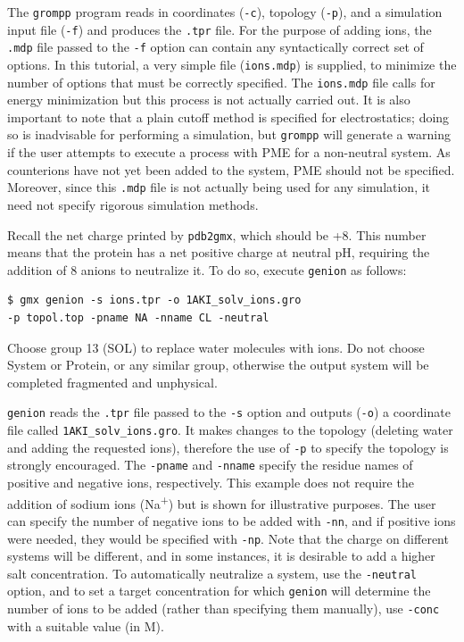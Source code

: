 \documentclass[9pt,tutorial]{livecoms}
\begin{document}
The \texttt{grompp} program reads in coordinates (\texttt{-c}), topology (\texttt{-p}), and a simulation input file (\texttt{-f}) and produces the \texttt{.tpr} file. For the purpose of adding ions, the \texttt{.mdp} file passed to the \texttt{-f} option can contain any syntactically correct set of options. In this tutorial, a very simple file (\texttt{ions.mdp}) is supplied, to minimize the number of options that must be correctly specified. The \texttt{ions.mdp} file calls for energy minimization but this process is not actually carried out. It is also important to note that a plain cutoff method is specified for electrostatics; doing so is inadvisable for performing a simulation, but \texttt{grompp} will generate a warning if the user attempts to execute a process with PME for a non-neutral system. As counterions have not yet been added to the system, PME should not be specified. Moreover, since this \texttt{.mdp} file is not actually being used for any simulation, it need not specify rigorous simulation methods.

Recall the net charge printed by \texttt{pdb2gmx}, which should be +8. This number means that the protein has a net positive charge at neutral pH, requiring the addition of 8 anions to neutralize it. To do so, execute \texttt{genion} as follows:

\begin{verbatim}
$ gmx genion -s ions.tpr -o 1AKI_solv_ions.gro 
-p topol.top -pname NA -nname CL -neutral
\end{verbatim}

Choose group 13 (SOL) to replace water molecules with ions. Do not choose System or Protein, or any similar group, otherwise the output system will be completed fragmented and unphysical.

\texttt{genion} reads the \texttt{.tpr} file passed to the \texttt{-s} option and outputs (\texttt{-o}) a coordinate file called \texttt{1AKI\_solv\_ions.gro}. It makes changes to the topology (deleting water and adding the requested ions), therefore the use of \texttt{-p} to specify the topology is strongly encouraged. The \texttt{-pname} and \texttt{-nname} specify the residue names of positive and negative ions, respectively. This example does not require the addition of sodium ions (Na\textsuperscript{+}) but is shown for illustrative purposes. The user can specify the number of negative ions to be added with \texttt{-nn}, and if positive ions were needed, they would be specified with \texttt{-np}. Note that the charge on different systems will be different, and in some instances, it is desirable to add a higher salt concentration. To automatically neutralize a system, use the \texttt{-neutral} option, and to set a target concentration for which \texttt{genion} will determine the number of ions to be added (rather than specifying them manually), use \texttt{-conc} with a suitable value (in M).
\end{document}
